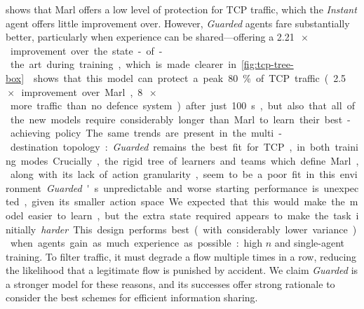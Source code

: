 \documentclass[10pt, times, conference, letterpaper]{IEEEtran}
\begin{document}
 shows that Marl offers a low level of protection for TCP traffic, which the \emph{Instant} agent offers little improvement over.
However, \emph{Guarded} agents fare substantially better, particularly when experience can be shared---offering a \SI{2.21}{$\!\times$} improvement over the state-of-the art during training, which is made clearer in \cref{fig:tcp-tree-box}.
 shows that this model can protect a peak \SI{80}{\percent} of TCP traffic (\SI{2.5}{$\!\times$} improvement over Marl, \SI{8}{$\!\times$} more traffic than no defence system) after just \SI{100}{\second}, but also that all of the new models require considerably longer than Marl to learn their best-achieving policy.
The same trends are present in the multi-destination topology: \emph{Guarded} remains the best fit for TCP, in both training modes.
Crucially, the rigid tree of learners and teams which define Marl, along with its lack of action granularity, seem to be a poor fit in this environment.

\emph{Guarded}'s unpredictable and worse starting performance is unexpected, given its smaller action space.
We expected that this would make the model easier to learn, but the extra state required appears to make the task initially \emph{harder}.
This design performs best (with considerably lower variance) when agents gain as much experience as possible: high $n$ and single-agent training.
To filter traffic, it must degrade a flow multiple times in a row, reducing the likelihood that a legitimate flow is punished by accident.
We claim \emph{Guarded} is a stronger model for these reasons, and its successes offer strong rationale to consider the best schemes for efficient information sharing.

\end{document}
